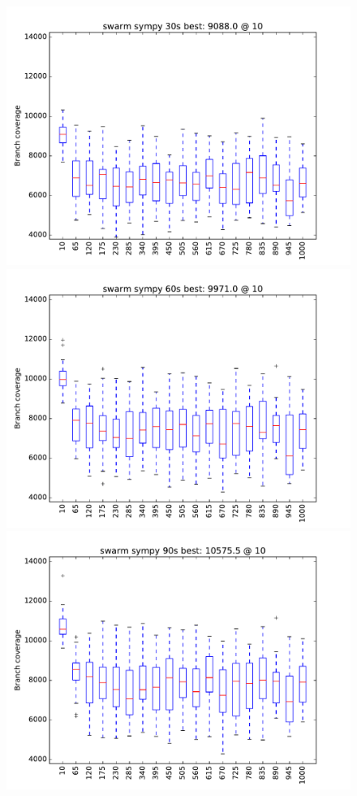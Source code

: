 \begin{figure}
\includegraphics[width=\columnwidth]{graphs/sympyswarm30}
\includegraphics[width=\columnwidth]{graphs/sympyswarm60}
\includegraphics[width=\columnwidth]{graphs/sympyswarm90}
\end{figure}
